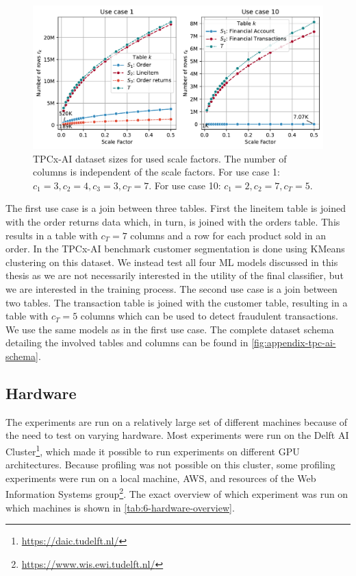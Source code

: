 \begin{figure}
    \centering
    \includegraphics[width=\linewidth]{chapters/06_evaluation/figures/tpcx-ai-data-chars.pdf}
    \caption[TPCx-AI dataset sizes for used scale factors.]{TPCx-AI dataset sizes for used scale factors. The number of columns is independent of the scale factors. For use case 1: $c_1=3, c_2=4, c_3=3, c_T=7$. For use case 10: $c_1=2, c_2=7, c_T=5$.}
    \label{fig:tpcx-ai-data-chars}
\end{figure}

The first use case is a join between three tables. First the lineitem table is joined with the order returns data which, in turn, is joined with the orders table. This results in a table with $c_T=7$ columns and a row for each product sold in an order. In the TPCx-AI benchmark customer segmentation is done using KMeans clustering on this dataset. We instead test all four ML models discussed in this thesis as we are not necessarily interested in the utility of the final classifier, but we are interested in the training process. The second use case is a join between two tables. The transaction table is joined with the customer table, resulting in a table with $c_T=5$ columns which can be used to detect fraudulent transactions. We use the same models as in the first use case. The complete dataset schema detailing the involved tables and columns can be found in \autoref{fig:appendix-tpc-ai-schema}.

\subsection{Hardware}
\label{subsec:6-hardware}

The experiments are run on a relatively large set of different machines because of the need to test on varying hardware. Most experiments were run on the Delft AI Cluster\footnote{\url{https://daic.tudelft.nl/}}, which made it possible to run experiments on different GPU architectures. Because profiling was not possible on this cluster, some profiling experiments were run on a local machine, AWS, and resources of the Web Information Systems group\footnote{\url{https://www.wis.ewi.tudelft.nl/}}. The exact overview of which experiment was run on which machines is shown in \autoref{tab:6-hardware-overview}.

